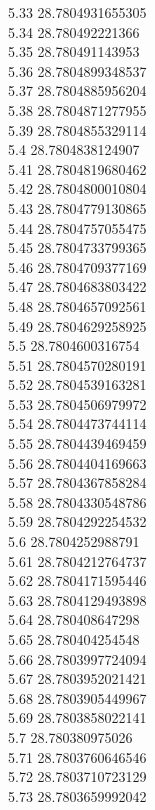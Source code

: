 {5.33	28.7804931655305\\
5.34	28.780492221366\\
5.35	28.780491143953\\
5.36	28.7804899348537\\
5.37	28.7804885956204\\
5.38	28.7804871277955\\
5.39	28.7804855329114\\
5.4	28.7804838124907\\
5.41	28.7804819680462\\
5.42	28.7804800010804\\
5.43	28.7804779130865\\
5.44	28.7804757055475\\
5.45	28.7804733799365\\
5.46	28.7804709377169\\
5.47	28.7804683803422\\
5.48	28.7804657092561\\
5.49	28.7804629258925\\
5.5	28.7804600316754\\
5.51	28.7804570280191\\
5.52	28.7804539163281\\
5.53	28.7804506979972\\
5.54	28.7804473744114\\
5.55	28.7804439469459\\
5.56	28.7804404169663\\
5.57	28.7804367858284\\
5.58	28.7804330548786\\
5.59	28.7804292254532\\
5.6	28.7804252988791\\
5.61	28.7804212764737\\
5.62	28.7804171595446\\
5.63	28.7804129493898\\
5.64	28.780408647298\\
5.65	28.780404254548\\
5.66	28.7803997724094\\
5.67	28.7803952021421\\
5.68	28.7803905449967\\
5.69	28.7803858022141\\
5.7	28.780380975026\\
5.71	28.7803760646546\\
5.72	28.7803710723129\\
5.73	28.7803659992042\\
}
